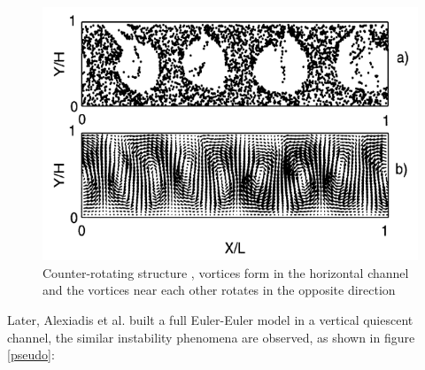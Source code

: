 \begin{figure}[H]
    \centering
    \includegraphics[scale = 0.75]{rotating.png}
    \caption{Counter-rotating structure \cite{Climent1999}, vortices form in the horizontal channel and the vortices near each other rotates in the opposite direction}
    \label{rotating}
\end{figure}

Later, Alexiadis et al. \cite{Alexiadis2011, Alexiadis2012, Alexiadis2012a, Alexiadis2012b} built a full Euler-Euler model in a vertical quiescent channel, the similar instability phenomena are observed, as shown in figure \ref{pseudo}:


